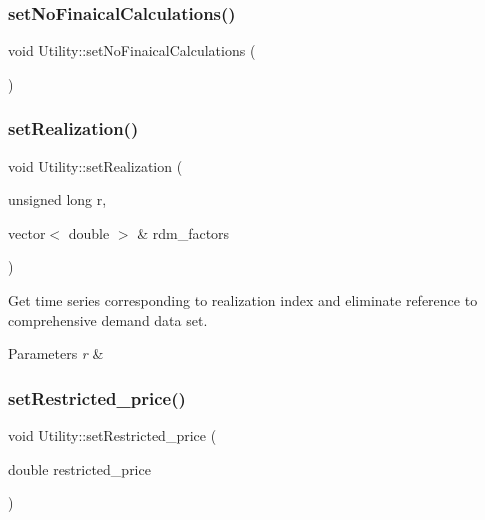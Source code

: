 \mbox{\label{classUtility_a6a89bff2044b4f68714ce9934344e2ad_a6a89bff2044b4f68714ce9934344e2ad}} 
\subsubsection{\texorpdfstring{set\+No\+Finaical\+Calculations()}{setNoFinaicalCalculations()}}
{\footnotesize\ttfamily void Utility\+::set\+No\+Finaical\+Calculations (\begin{DoxyParamCaption}{ }\end{DoxyParamCaption})}

\mbox{\label{classUtility_a2d41989b4154aed5c2fb99a27183ca34_a2d41989b4154aed5c2fb99a27183ca34}} 
\subsubsection{\texorpdfstring{set\+Realization()}{setRealization()}}
{\footnotesize\ttfamily void Utility\+::set\+Realization (\begin{DoxyParamCaption}\item[{unsigned long}]{r,  }\item[{vector$<$ double $>$ \&}]{rdm\+\_\+factors }\end{DoxyParamCaption})}

Get time series corresponding to realization index and eliminate reference to comprehensive demand data set. 
\begin{DoxyParams}{Parameters}
{\em r} & \\
\hline
\end{DoxyParams}
\mbox{\label{classUtility_a7f642d886a6d1d165e86b2e6a7c51ed4_a7f642d886a6d1d165e86b2e6a7c51ed4}} 
\subsubsection{\texorpdfstring{set\+Restricted\+\_\+price()}{setRestricted\_price()}}
{\footnotesize\ttfamily void Utility\+::set\+Restricted\+\_\+price (\begin{DoxyParamCaption}\item[{double}]{restricted\+\_\+price }\end{DoxyParamCaption})}

